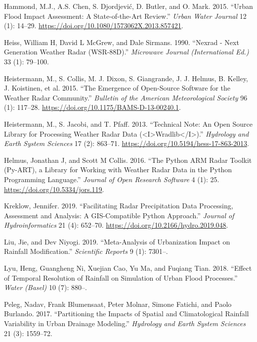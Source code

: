 \documentclass[11pt]{article}
\begin{document}
\begin{hangparas}{1.5em}{1}
\hypertarget{citeproc_bib_item_9}{Hammond, M.J., A.S. Chen, S. Djordjević, D. Butler, and O. Mark. 2015. “Urban Flood Impact Assessment: A State-of-the-Art Review.” \textit{Urban Water Journal} 12 (1): 14–29. \url{https://doi.org/10.1080/1573062X.2013.857421}.}

\hypertarget{citeproc_bib_item_10}{Heiss, William H, David L McGrew, and Dale Sirmans. 1990. “Nexrad - Next Generation Weather Radar (WSR-88D).” \textit{Microwave Journal (International Ed.)} 33 (1): 79–100.}

\hypertarget{citeproc_bib_item_11}{Heistermann, M., S. Collis, M. J. Dixon, S. Giangrande, J. J. Helmus, B. Kelley, J. Koistinen, et al. 2015. “The Emergence of Open-Source Software for the Weather Radar Community.” \textit{Bulletin of the American Meteorological Society} 96 (1): 117–28. \url{https://doi.org/10.1175/BAMS-D-13-00240.1}.}

\hypertarget{citeproc_bib_item_12}{Heistermann, M., S. Jacobi, and T. Pfaff. 2013. “Technical Note: An Open Source Library for Processing Weather Radar Data (<I>Wradlib</I>).” \textit{Hydrology and Earth System Sciences} 17 (2): 863–71. \url{https://doi.org/10.5194/hess-17-863-2013}.}

\hypertarget{citeproc_bib_item_13}{Helmus, Jonathan J, and Scott M Collis. 2016. “The Python ARM Radar Toolkit (Py-ART), a Library for Working with Weather Radar Data in the Python Programming Language.” \textit{Journal of Open Research Software} 4 (1): 25. \url{https://doi.org/10.5334/jors.119}.}

\hypertarget{citeproc_bib_item_14}{Kreklow, Jennifer. 2019. “Facilitating Radar Precipitation Data Processing, Assessment and Analysis: A GIS-Compatible Python Approach.” \textit{Journal of Hydroinformatics} 21 (4): 652–70. \url{https://doi.org/10.2166/hydro.2019.048}.}

\hypertarget{citeproc_bib_item_15}{Liu, Jie, and Dev Niyogi. 2019. “Meta-Analysis of Urbanization Impact on Rainfall Modification.” \textit{Scientific Reports} 9 (1): 7301–.}

\hypertarget{citeproc_bib_item_16}{Lyu, Heng, Guangheng Ni, Xuejian Cao, Yu Ma, and Fuqiang Tian. 2018. “Effect of Temporal Resolution of Rainfall on Simulation of Urban Flood Processes.” \textit{Water (Basel)} 10 (7): 880–.}

\hypertarget{citeproc_bib_item_17}{Peleg, Nadav, Frank Blumensaat, Peter Molnar, Simone Fatichi, and Paolo Burlando. 2017. “Partitioning the Impacts of Spatial and Climatological Rainfall Variability in Urban Drainage Modeling.” \textit{Hydrology and Earth System Sciences} 21 (3): 1559–72.}


\end{hangparas}
\end{document}
